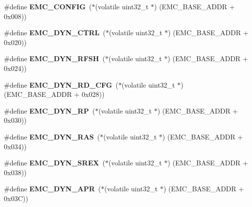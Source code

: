 \begin{DoxyCompactItemize}
\#define {\bfseries E\+M\+C\+\_\+\+C\+O\+N\+F\+IG}~($\ast$(volatile uint32\+\_\+t $\ast$) (E\+M\+C\+\_\+\+B\+A\+S\+E\+\_\+\+A\+D\+DR + 0x008))
\item 
\mbox{\label{group__lpc24xx__regs_ga3f985ac1f7965950ffef598c1643a21f}} 
\#define {\bfseries E\+M\+C\+\_\+\+D\+Y\+N\+\_\+\+C\+T\+RL}~($\ast$(volatile uint32\+\_\+t $\ast$) (E\+M\+C\+\_\+\+B\+A\+S\+E\+\_\+\+A\+D\+DR + 0x020))
\item 
\mbox{\label{group__lpc24xx__regs_gae441eb1fc82a2d0b3f2bbb097d75c640}} 
\#define {\bfseries E\+M\+C\+\_\+\+D\+Y\+N\+\_\+\+R\+F\+SH}~($\ast$(volatile uint32\+\_\+t $\ast$) (E\+M\+C\+\_\+\+B\+A\+S\+E\+\_\+\+A\+D\+DR + 0x024))
\item 
\mbox{\label{group__lpc24xx__regs_gad31cb7cb5f91f9777b39d9e27799bc14}} 
\#define {\bfseries E\+M\+C\+\_\+\+D\+Y\+N\+\_\+\+R\+D\+\_\+\+C\+FG}~($\ast$(volatile uint32\+\_\+t $\ast$) (E\+M\+C\+\_\+\+B\+A\+S\+E\+\_\+\+A\+D\+DR + 0x028))
\item 
\mbox{\label{group__lpc24xx__regs_ga7f83bba422d4a53c21941b890db10b64}} 
\#define {\bfseries E\+M\+C\+\_\+\+D\+Y\+N\+\_\+\+RP}~($\ast$(volatile uint32\+\_\+t $\ast$) (E\+M\+C\+\_\+\+B\+A\+S\+E\+\_\+\+A\+D\+DR + 0x030))
\item 
\mbox{\label{group__lpc24xx__regs_ga78b5951e6c3beec47fe3c0912521c458}} 
\#define {\bfseries E\+M\+C\+\_\+\+D\+Y\+N\+\_\+\+R\+AS}~($\ast$(volatile uint32\+\_\+t $\ast$) (E\+M\+C\+\_\+\+B\+A\+S\+E\+\_\+\+A\+D\+DR + 0x034))
\item 
\mbox{\label{group__lpc24xx__regs_gaa3f4ef64841a6e98b0e9733c354f7a14}} 
\#define {\bfseries E\+M\+C\+\_\+\+D\+Y\+N\+\_\+\+S\+R\+EX}~($\ast$(volatile uint32\+\_\+t $\ast$) (E\+M\+C\+\_\+\+B\+A\+S\+E\+\_\+\+A\+D\+DR + 0x038))
\item 
\mbox{\label{group__lpc24xx__regs_gaf03e6f28c7e2d9d341ea956728cc6fe4}} 
\#define {\bfseries E\+M\+C\+\_\+\+D\+Y\+N\+\_\+\+A\+PR}~($\ast$(volatile uint32\+\_\+t $\ast$) (E\+M\+C\+\_\+\+B\+A\+S\+E\+\_\+\+A\+D\+DR + 0x03\+C))
\item 
\mbox{\label{group__lpc24xx__regs_ga84e14c1b610f9bf413d37ba339879da9}} 

\end{DoxyCompactItemize}
